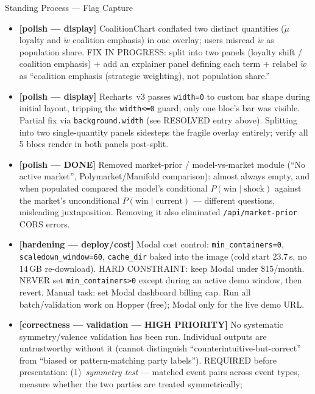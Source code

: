 \documentclass[11pt]{article}
\begin{document}
\begin{taskbox}{Standing Process --- Flag Capture}
{\begin{itemize}[leftmargin=1.6em, itemsep=1pt]
      effect on:'' bucket.
    \item[$\square$] \textbf{[polish --- display]} CoalitionChart
      conflated two distinct quantities ($\tilde\mu$ loyalty and
      $\tilde{w}$ coalition emphasis) in one overlay; users misread
      $\tilde{w}$ as population share. FIX IN PROGRESS: split into two
      panels (loyalty shift / coalition emphasis) + add an explainer panel
      defining each term + relabel $\tilde{w}$ as ``coalition emphasis
      (strategic weighting), not population share.''
    \item[$\square$] \textbf{[polish --- display]} Recharts~v3 passes
      \texttt{width=0} to custom bar shape during initial layout, tripping
      the \texttt{width<=0} guard; only one bloc's bar was visible.
      Partial fix via \texttt{background.width} (see RESOLVED entry
      above). Splitting into two single-quantity panels sidesteps the
      fragile overlay entirely; verify all 5 blocs render in both panels
      post-split.
    \item[$\boxtimes$] \textbf{[polish --- DONE]} Removed market-prior /
      model-vs-market module (``No active market'',
      Polymarket/Manifold comparison): almost always empty, and when
      populated compared the model's conditional
      $P(\text{win}\mid\text{shock})$ against the market's unconditional
      $P(\text{win}\mid\text{current})$ --- different questions, misleading
      juxtaposition. Removing it also eliminated
      \texttt{/api/market-prior} CORS errors.
    \item[$\square$] \textbf{[hardening --- deploy/cost]}
      Modal cost control: \texttt{min\_containers=0},
      \texttt{scaledown\_window=60}, \texttt{cache\_dir} baked into the
      image (cold start 23.7\,s, no 14\,GB re-download). HARD CONSTRAINT:
      keep Modal under \$15/month. NEVER set \texttt{min\_containers>0}
      except during an active demo window, then revert. Manual task: set
      Modal dashboard billing cap. Run all batch/validation work on
      Hopper (free); Modal only for the live demo URL.
    \item[$\square$] \textbf{[correctness --- validation --- HIGH PRIORITY]}
      No systematic symmetry/valence validation has been run. Individual
      outputs are untrustworthy without it (cannot distinguish
      ``counterintuitive-but-correct'' from ``biased or
      pattern-matching party labels''). REQUIRED before presentation:
      (1)~\emph{symmetry test} --- matched event pairs across event types,
      measure whether the two parties are treated symmetrically;

\end{itemize}}
\end{taskbox}
\end{document}
